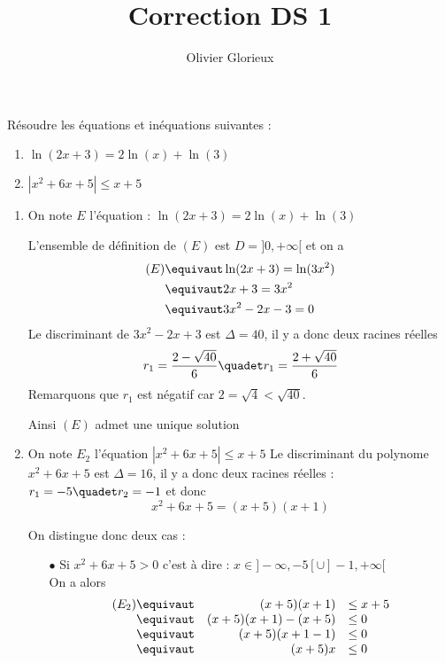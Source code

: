 \documentclass[a4paper, 11pt,reqno]{article}
\author{Olivier Glorieux}
\begin{document}
\title{Correction DS 1\\}



\vspace{1.5cm}
\begin{exercice}
Résoudre les équations et inéquations suivantes :
\begin{enumerate}
\item $\ln (2 x+3)=2 \ln (x)+\ln (3)$
\item  $\left|x^2+6 x+5\right| \leq x+5$
\end{enumerate}
\end{exercice}


\begin{correction}
\begin{enumerate}
\item On note $E$ l'équation : $\ln (2 x+3)=2 \ln (x)+\ln (3) $

L'ensemble de définition de $(E)$ est $D= ]0,+\infty[$ et  on a 
\begin{align*}
(E) \equivaut & \ln(2x+3)=\ln(3x^2)\\
	\equivaut & 2x+3 = 3x^2\\
		\equivaut & 3x^2-2x-3=0
\end{align*}
Le discriminant de $3x^2-2x+3$ est $\Delta = 40$, il y a donc deux racines réelles 
$$r_1 =\frac{2 -\sqrt{40} }{6} \quadet r_1 =\frac{2 +\sqrt{40} }{6}$$
Remarquons que $r_1$ est négatif car $2 =\sqrt{4}<\sqrt{40}$. 

Ainsi  $(E)$ admet une unique solution 


\item On note $E_2$ l'équation $\left|x^2+6 x+5\right| \leq x+5 $
Le discriminant du polynome $x^2+6 x+5$ est $\Delta = 16$, il y  a donc deux racines réelles :
$r_1 = -5 \quadet r_2 = -1$
et donc $$x^2 +6x+5 = (x+5)(x+1)$$

On distingue donc deux cas : 
\begin{itemize}
\item[$\bullet$]Si $x^2 +6x+5> 0$ c'est à dire : $x\in ]-\infty, -5[\cup ]-1, +\infty[$\\

On a alors $$\begin{array}{rrl}
(E_2) \equivaut& (x+5)(x+1)& \leq x+5\\
 \equivaut& (x+5)(x+1) - (x+5)&\leq 0\\
 \equivaut &(x+5)(x+1-1)&\leq 0\\
 \equivaut& (x+5)x&\leq 0
\end{array}$$




\end{itemize}
\end{enumerate}
\end{correction}
\end{document}
